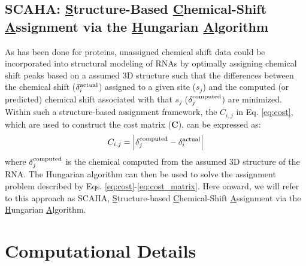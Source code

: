 \documentclass[journal=jcisd8,manuscript=article,layout=onecolumn]{achemso}
\begin{document}
\subsection{SCAHA: \underline{S}tructure-Based \underline{C}hemical-Shift \underline{A}ssignment via the \underline{H}ungarian \underline{A}lgorithm} As has been done for proteins\cite{meiler2003rapid, hart2008nmr, courtney2015experimental}, unassigned chemical shift data could be incorporated into structural modeling of RNAs by optimally assigning chemical shift peaks based on a assumed 3D structure such that the differences between the chemical shift  ($\delta_{i}^{\rm actual}$) assigned to a given site ($s_{j}$) and the computed (or predicted) chemical shift associated with that $s_{j}$ ($\delta_{j}^{\rm computed}$) are minimized.  Within such a structure-based assignment framework, the $C_{i,j}$  in  Eq. \ref{eq:cost}, which are used to construct the cost matrix (\textbf{C}), can be expressed as:
\begin{equation}\label{eq:cost_matrix} 
C_{i,j} =  \Big{|} \delta_{j}^{\rm computed} - \delta_{i}^{\rm actual}\Big{|}
\end{equation}
where $\delta_{j}^{\rm computed}$ is the chemical computed from the assumed 3D structure of the RNA. The Hungarian algorithm can then be used to solve the assignment problem described by Eqs.  \ref{eq:cost}-\ref{eq:cost_matrix}. Here onward, we will refer to this approach as SCAHA, \underline{S}tructure-based \underline{C}hemical-Shift \underline{A}ssignment via the \underline{H}ungarian \underline{A}lgorithm.

\section{Computational Details}
\label{sec:2}
\end{document}
